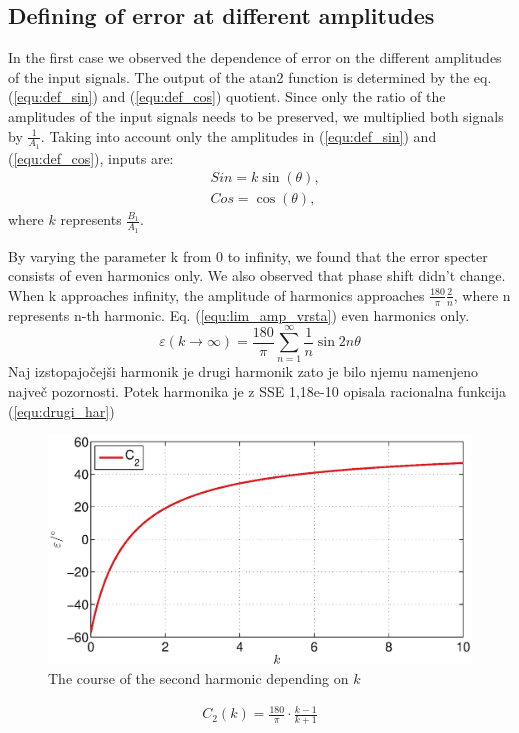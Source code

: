 \documentclass[a4paper]{article}
\begin{document}
\subsection{Defining of error at different amplitudes}
In the first case we observed the dependence of error on the different amplitudes of the input signals. The output of the atan2 function is determined by the eq. (\ref{equ:def_sin}) and (\ref{equ:def_cos}) quotient. Since only the ratio of the amplitudes of the input signals needs to be preserved, we multiplied both signals by $\frac{1}{A_1}$. Taking into account only the amplitudes in (\ref{equ:def_sin}) and (\ref{equ:def_cos}), inputs are:
	\begin{eqnarray}
	\label{equ:def_sin_ama}
	&Sin = k \sin(\theta),\\
	\label{equ:def_cos_amp}
	&Cos =\cos(\theta),
	\end{eqnarray}
where $k$ represents $\frac{B_1}{A_1}$.

By varying the parameter k from 0 to infinity, we found that the error specter consists of even harmonics only. We also observed that phase shift didn't change. When k approaches infinity, the amplitude of harmonics approaches $\frac{180}{\pi}\frac{2}{n}$, where n represents n-th harmonic. Eq. (\ref{equ:lim_amp_vrsta}) even harmonics only.
\begin{equation}
\label{equ:lim_amp_vrsta}
\varepsilon(k \rightarrow \infty) = \frac{180}{\pi}\sum_{n=1}^{\infty}\frac{1}{n} \sin 2 n \theta
\end{equation}
Naj izstopajočejši harmonik je drugi harmonik zato je bilo njemu namenjeno največ pozornosti.
Potek harmonika je z SSE 1,18e-10 opisala racionalna funkcija (\ref{equ:drugi_har})

\begin{figure}[!htb]
	\begin{center}
		\includegraphics[width=\linewidth]{./Slike/amp.eps}
		\caption{The course of the second harmonic depending on $k$} \label{fig:amp}
	\end{center}
\end{figure}
\begin{eqnarray}
\label{equ:drugi_har}
C_2(k)=\frac{180}{\pi}\cdot\frac{k-1}{k+1}
\end{eqnarray}
\end{document}
